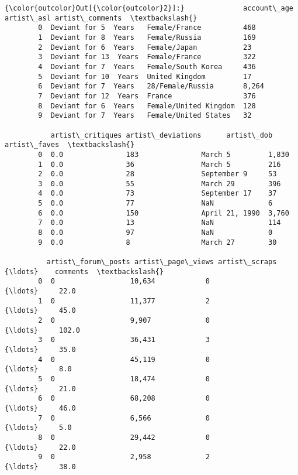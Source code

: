 \documentclass[11pt]{article}
\begin{document}
\begin{Verbatim}[commandchars=\\\{\}]
{\color{outcolor}Out[{\color{outcolor}2}]:}              account\_age             artist\_asl artist\_comments  \textbackslash{}
        0  Deviant for 5  Years   Female/France          468              
        1  Deviant for 8  Years   Female/Russia          169              
        2  Deviant for 6  Years   Female/Japan           23               
        3  Deviant for 13  Years  Female/France          322              
        4  Deviant for 7  Years   Female/South Korea     436              
        5  Deviant for 10  Years  United Kingdom         17               
        6  Deviant for 7  Years   28/Female/Russia       8,264            
        7  Deviant for 12  Years  France                 376              
        8  Deviant for 6  Years   Female/United Kingdom  128              
        9  Deviant for 7  Years   Female/United States   32               
        
           artist\_critiques artist\_deviations      artist\_dob artist\_faves  \textbackslash{}
        0  0.0               183               March 5         1,830         
        1  0.0               36                March 5         216           
        2  0.0               28                September 9     53            
        3  0.0               55                March 29        396           
        4  0.0               73                September 17    37            
        5  0.0               77                NaN             6             
        6  0.0               150               April 21, 1990  3,760         
        7  0.0               13                NaN             114           
        8  0.0               97                NaN             0             
        9  0.0               8                 March 27        30            
        
          artist\_forum\_posts artist\_page\_views artist\_scraps   {\ldots}    comments  \textbackslash{}
        0  0                  10,634            0              {\ldots}     22.0      
        1  0                  11,377            2              {\ldots}     45.0      
        2  0                  9,907             0              {\ldots}     102.0     
        3  0                  36,431            3              {\ldots}     35.0      
        4  0                  45,119            0              {\ldots}     8.0       
        5  0                  18,474            0              {\ldots}     21.0      
        6  0                  68,208            0              {\ldots}     46.0      
        7  0                  6,566             0              {\ldots}     5.0       
        8  0                  29,442            0              {\ldots}     22.0      
        9  0                  2,958             2              {\ldots}     38.0      
        

\end{Verbatim}
\end{document}
